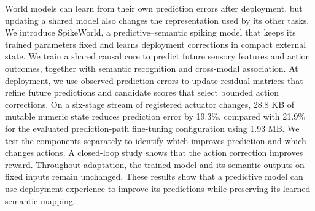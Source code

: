World models can learn from their own prediction errors after deployment, but
updating a shared model also changes the representation used by its other tasks.
We introduce SpikeWorld, a predictive--semantic spiking model that keeps its
trained parameters fixed and learns deployment corrections in compact external
state. We train a shared causal core to predict future sensory features and
action outcomes, together with semantic recognition and cross-modal association.
At deployment, we use observed prediction errors to update residual matrices
that refine future predictions and candidate scores that select bounded action
corrections. On a six-stage stream of registered actuator changes,
28.8 KB of mutable numeric state reduces prediction error by 19.3\%, compared
with 21.9\% for the evaluated prediction-path fine-tuning configuration using
1.93 MB. We test the components separately to identify which improves prediction and
which changes actions. A closed-loop study shows that the action correction
improves reward. Throughout adaptation, the trained model and its semantic
outputs on fixed inputs remain unchanged. These results show that a predictive model can use deployment experience to
improve its predictions while preserving its learned semantic mapping.
